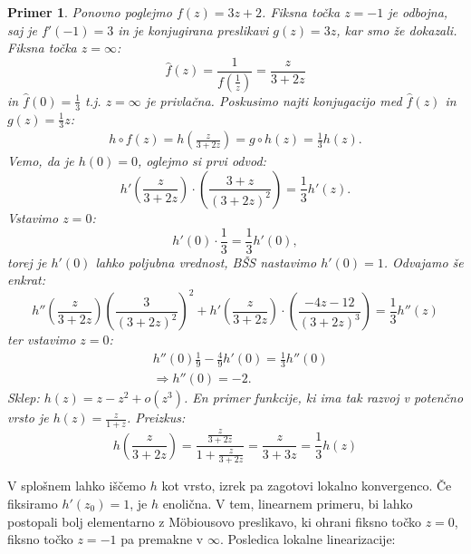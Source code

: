 \documentclass{article}
\newtheorem{primer}{Primer}
\begin{document}
\begin{primer}
Ponovno poglejmo $f(z) = 3z + 2$. Fiksna točka $z = -1$ je odbojna, saj je 
$f'(-1) = 3$ in je konjugirana preslikavi $g(z) = 3z$, kar smo že dokazali. \\
Fiksna točka $z = \infty$:
$$
\hat{f}(z) = \frac{1}{f(\frac{1}{z})} = \frac{z}{3 + 2z}
$$
in $\hat{f}(0) = \frac{1}{3}$ t.j. $z = \infty$ je privlačna. 
Poskusimo najti konjugacijo med $\hat{f}(z)$ in $g(z) = \frac{1}{3} z$:
\begin{align*}
h\circ f(z) = h\left(\frac{z}{3 + 2z}\right) = g\circ h(z) = \frac{1}{3}h(z).
\end{align*}
Vemo, da je $h(0) = 0$, oglejmo si prvi odvod:
$$
h'\left(\frac{z}{3 + 2z}\right) \cdot \left(\frac{3 + z}{(3 + 2z)^2}\right) = \frac{1}{3} h'(z).
$$
Vstavimo $z = 0$:
$$
h'(0) \cdot \frac{1}{3} = \frac{1}{3} h'(0),
$$
torej je $h'(0)$ lahko poljubna vrednost, BŠS nastavimo $h'(0) = 1$. Odvajamo 
še enkrat:
$$
h''\left(\frac{z}{3 + 2z}\right) \left( \frac{3}{(3 + 2z)^2}\right)^2 + h'\left(\frac{z}{3 + 2z}\right) \cdot \left( \frac{-4z - 12}{(3 + 2z)^3}\right) = \frac{1}{3} h''(z)
$$
ter vstavimo $z = 0$:
\begin{align*}
&h''(0) \frac{1}{9} - \frac{4}{9} h'(0) = \frac{1}{3} h''(0) \\[1mm]
&\Longrightarrow h''(0) = -2.
\end{align*}
Sklep: $h(z) = z - z^2 + o(z^3)$. En primer funkcije, ki ima 
tak razvoj v potenčno vrsto je $h(z) = \frac{z}{1 + z}$. Preizkus:
$$
h\left( \frac{z}{3 + 2z}\right) = \frac{\frac{z}{3 + 2z}}{1 + \frac{z}{3 + 2z}} = \frac{z}{3 + 3z} = \frac{1}{3} h(z)
$$
\end{primer}
V splošnem lahko iščemo $h$ kot vrsto, izrek pa zagotovi lokalno konvergenco. 
Če fiksiramo $h'(z_0) = 1$, je $h$ enolična. V tem, linearnem primeru, 
bi lahko postopali bolj elementarno z Möbiousovo preslikavo, ki 
ohrani fiksno točko $z = 0$, fiksno točko $z = -1$ pa premakne v 
$\infty$.
\noindent
Posledica lokalne linearizacije:
\end{document}
